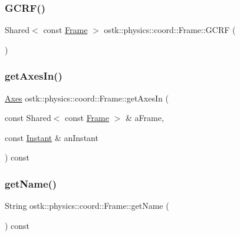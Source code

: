 \subsubsection{\texorpdfstring{G\+C\+R\+F()}{GCRF()}}
{\footnotesize\ttfamily Shared$<$ const \hyperlink{classostk_1_1physics_1_1coord_1_1_frame}{Frame} $>$ ostk\+::physics\+::coord\+::\+Frame\+::\+G\+C\+RF (\begin{DoxyParamCaption}{ }\end{DoxyParamCaption})\hspace{0.3cm}{\ttfamily [static]}}

\mbox{\label{classostk_1_1physics_1_1coord_1_1_frame_ac75780963694dd74ea2e6a66f6ae17d8}} 
\subsubsection{\texorpdfstring{get\+Axes\+In()}{getAxesIn()}}
{\footnotesize\ttfamily \hyperlink{classostk_1_1physics_1_1coord_1_1_axes}{Axes} ostk\+::physics\+::coord\+::\+Frame\+::get\+Axes\+In (\begin{DoxyParamCaption}\item[{const Shared$<$ const \hyperlink{classostk_1_1physics_1_1coord_1_1_frame}{Frame} $>$ \&}]{a\+Frame,  }\item[{const \hyperlink{classostk_1_1physics_1_1time_1_1_instant}{Instant} \&}]{an\+Instant }\end{DoxyParamCaption}) const}

\mbox{\label{classostk_1_1physics_1_1coord_1_1_frame_a47aca195a73e14198f6d615c8988ce6e}} 
\subsubsection{\texorpdfstring{get\+Name()}{getName()}}
{\footnotesize\ttfamily String ostk\+::physics\+::coord\+::\+Frame\+::get\+Name (\begin{DoxyParamCaption}{ }\end{DoxyParamCaption}) const}

